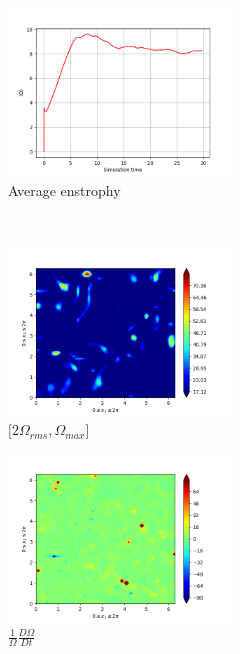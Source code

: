 \begin{figure}[H]
    \begin{subfigure}[H]{0.45\textwidth}
        \includegraphics[height=1.75in]{media/run-cds-65/enst-average1330.png}
        \caption{Average enstrophy}
    \end{subfigure}
    ~
    \begin{subfigure}[H]{0.45\textwidth}
        \includegraphics[height=1.75in]{media/run-cds-65/enst-2-1330.png}
        \caption{$[2\Omega_{rms}, \Omega_{max} $] }
    \end{subfigure}
    \newline
    \begin{subfigure}[H]{0.45\textwidth}
        \includegraphics[height=1.75in]{media/run-cds-65/enst-1330.png}
        \caption{$\frac{1}{\Omega} \frac{D \Omega}{Dt}$}
    \end{subfigure}
    ~
    \begin{subfigure}{0.45\textwidth}

\end{subfigure}
\end{figure}
